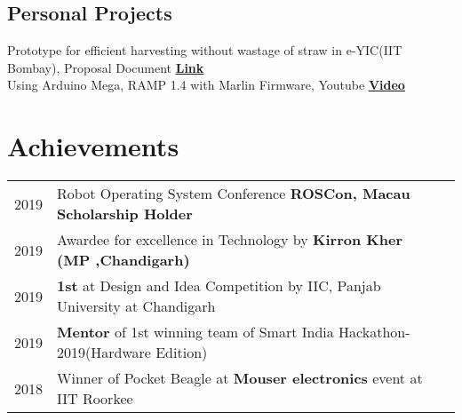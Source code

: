 \documentclass[]{font}
\begin{document}
\begin{minipage}[t]{0.69\textwidth}
\subsection{Personal Projects}
\textbullet{} Prototype for efficient harvesting without wastage of straw in e-YIC(IIT Bombay), Proposal Document \underline{\textbf{\href{https://drive.google.com/file/d/0B0cF1Lq6c1cPcURJdkJjQmVFcFk3eTgtTGg5VktPVHJWWU5R/view?usp=sharing}{Link}}}  \\
\vspace{\topsep} %
\textbullet{} Using Arduino Mega, RAMP 1.4 with Marlin Firmware, Youtube \textbf{\href{https://www.youtube.com/watch?v=D679CJQNnKo&t=1s}{\underline{Video}}}
\sectionsep



\section{Achievements} 
\begin{tabular}{rll}
2019         & Robot Operating System Conference \textbf{ROSCon, Macau Scholarship Holder}\\
2019         & Awardee for excellence in Technology by \textbf{Kirron Kher (MP ,Chandigarh)}\\
2019         & \textbf{1st} at Design and Idea Competition by IIC, Panjab University at Chandigarh \\  
2019         & \textbf{Mentor} of 1st winning team of Smart India Hackathon-2019(Hardware Edition)\\ 
2018	     & Winner of Pocket Beagle at \textbf{Mouser electronics} event at IIT Roorkee \\
\end{tabular}
\sectionsep


\end{minipage} 
\end{document}
